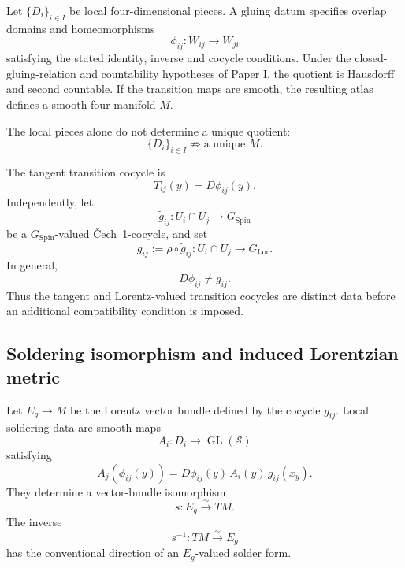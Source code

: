 \documentclass[11pt,a4paper]{article}
\theoremstyle{remark}
\newcommand{\SpinG}{G_{\mathrm{Spin}}}
\newcommand{\LorG}{G_{\mathrm{Lor}}}
\newcommand{\Smodel}{\mathcal S}
\newcommand{\Cech}{\ifmmode\text{\v{C}ech}\else\v{C}ech\fi}
\begin{document}
Let \(\{D_i\}_{i\in I}\) be local four-dimensional pieces.  A gluing datum specifies overlap domains and homeomorphisms
\begin{equation}
  \phi_{ij}:W_{ij}\longrightarrow W_{ji}
\tag{2.8}
\end{equation}
satisfying the stated identity, inverse and cocycle conditions.  Under the closed-gluing-relation and countability hypotheses of Paper I, the quotient is Hausdorff and second countable.  If the transition maps are smooth, the resulting atlas defines a smooth four-manifold \(M\).

The local pieces alone do not determine a unique quotient:
\begin{equation}
  \{D_i\}_{i\in I}
  \not\Longrightarrow
  \text{a unique }M.
\tag{2.9}
\end{equation}

The tangent transition cocycle is
\begin{equation}
  T_{ij}(y)=D\phi_{ij}(y).
\tag{2.10}
\end{equation}
Independently, let
\begin{equation}
  \widetilde g_{ij}:U_i\cap U_j\longrightarrow\SpinG
\tag{2.11}
\end{equation}
be a \(\SpinG\)-valued \Cech\ 1-cocycle, and set
\begin{equation}
  g_{ij}:=\rho\circ\widetilde g_{ij}:U_i\cap U_j\longrightarrow\LorG.
\tag{2.12}
\end{equation}
In general,
\begin{equation}
  D\phi_{ij}\neq g_{ij}.
\tag{2.13}
\end{equation}
Thus the tangent and Lorentz-valued transition cocycles are distinct data before an additional compatibility condition is imposed.

\subsection{Soldering isomorphism and induced Lorentzian metric}

Let \(E_g\to M\) be the Lorentz vector bundle defined by the cocycle \(g_{ij}\).  Local soldering data are smooth maps
\begin{equation}
  A_i:D_i\longrightarrow\operatorname{GL}(\Smodel)
\tag{2.14}
\end{equation}
satisfying
\begin{equation}
  A_j(\phi_{ij}(y))
  =D\phi_{ij}(y)\,A_i(y)\,g_{ij}(x_y).
\tag{2.15}\label{eq:soldering-law-hyp}
\end{equation}
They determine a vector-bundle isomorphism
\begin{equation}
  s:E_g\xrightarrow{\sim}TM.
\tag{2.16}
\end{equation}
The inverse
\begin{equation}
  s^{-1}:TM\xrightarrow{\sim}E_g
\tag{2.17}
\end{equation}
has the conventional direction of an \(E_g\)-valued solder form.
\end{document}
